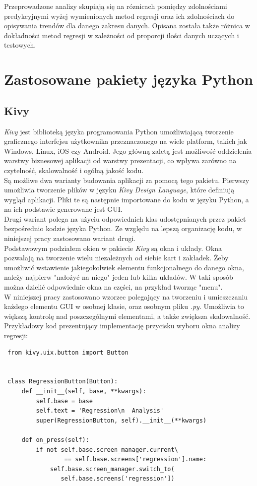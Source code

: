 Przeprowadzone analizy skupiają się na róznicach pomiędzy zdolnościami predykcyjnymi wyżej wymienionych metod regresji oraz ich zdolnościach do opisywania trendów dla danego zakresu danych.
Opisana została także różnica w dokładności metod regresji w zależności od proporcji ilości danych uczących i testowych.


\section{Zastosowane pakiety języka Python}

\subsection{Kivy}
\textit{Kivy} jest biblioteką języka programowania Python umożliwiającą tworzenie graficznego interfejsu użytkownika przeznaczonego na wiele platform, takich jak Windows, Linux, iOS czy Android.
Jego główną zaletą jest możliwość oddzielenia warstwy biznesowej aplikacji od warstwy prezentacji, co wpływa zarówno na czytelność, skalowalność i ogólną jakość kodu.\\

Są możliwe dwa warianty budowania aplikacji za pomocą tego pakietu. Pierwszy umożliwia tworzenie plików w języku \textit{Kivy Design Language}, które definiują wygląd aplikacji.
Pliki te są następnie importowane do kodu w języku Python, a na ich podstawie generowane jest GUI.\\

Drugi wariant polega na użyciu odpowiednich klas udostępnianych przez pakiet bezpośrednio kodzie języka Python. Ze względu na lepszą organizację kodu, w niniejszej pracy zastosowano wariant drugi.\\

Podstawowym podziałem okien w pakiecie \textit{Kivy} są okna i układy.
Okna pozwalają na tworzenie wielu niezależnych od siebie kart i zakładek. Żeby umożliwić wstawienie jakiegokolwiek elementu funkcjonalnego do danego okna, należy najpierw "nałożyć na niego" jeden lub kilka układów.
W taki sposób można dzielić odpowiednie okna na części, na przykład tworząc "menu".\\

W niniejszej pracy zastosowano wzorzec polegający na tworzeniu i umieszczaniu każdego elementu GUI w osobnej klasie, oraz osobnym pliku \textit{.py}. Umożliwia to większą kontrolę nad poszczególnymi elementami, a także zwiększa skalowalność.\\
Przykładowy kod prezentujący implementację przycisku wyboru okna analizy regresji:
\begin{lstlisting}
 from kivy.uix.button import Button


 class RegressionButton(Button):
     def __init__(self, base, **kwargs):
         self.base = base
         self.text = 'Regression\n  Analysis'
         super(RegressionButton, self).__init__(**kwargs)
 
     def on_press(self):
         if not self.base.screen_manager.current\
                 == self.base.screens['regression'].name:
             self.base.screen_manager.switch_to(
			    self.base.screens['regression'])
\end{lstlisting}


